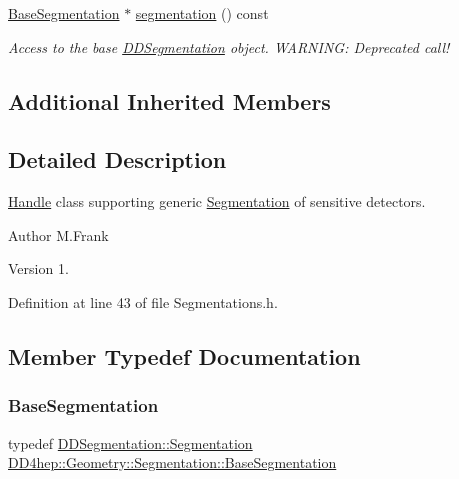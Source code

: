 \begin{DoxyCompactItemize}
\hyperlink{class_d_d4hep_1_1_geometry_1_1_segmentation_a50fcd62c91daf63c26a333d1ee51b192}{Base\+Segmentation} $\ast$ \hyperlink{class_d_d4hep_1_1_geometry_1_1_segmentation_a72ebea05efd4acd46adb3ed985c3f1d9}{segmentation} () const
\begin{DoxyCompactList}\small\item\em Access to the base \hyperlink{namespace_d_d4hep_1_1_d_d_segmentation}{D\+D\+Segmentation} object. W\+A\+R\+N\+I\+NG\+: Deprecated call! \end{DoxyCompactList}\end{DoxyCompactItemize}
\subsection*{Additional Inherited Members}


\subsection{Detailed Description}
\hyperlink{class_d_d4hep_1_1_handle}{Handle} class supporting generic \hyperlink{class_d_d4hep_1_1_geometry_1_1_segmentation}{Segmentation} of sensitive detectors. 

\begin{DoxyAuthor}{Author}
M.\+Frank 
\end{DoxyAuthor}
\begin{DoxyVersion}{Version}
1. 
\end{DoxyVersion}


Definition at line 43 of file Segmentations.\+h.



\subsection{Member Typedef Documentation}
\hypertarget{class_d_d4hep_1_1_geometry_1_1_segmentation_a50fcd62c91daf63c26a333d1ee51b192}{}\label{class_d_d4hep_1_1_geometry_1_1_segmentation_a50fcd62c91daf63c26a333d1ee51b192} 
\subsubsection{\texorpdfstring{Base\+Segmentation}{BaseSegmentation}}
{\footnotesize\ttfamily typedef \hyperlink{class_d_d4hep_1_1_d_d_segmentation_1_1_segmentation}{D\+D\+Segmentation\+::\+Segmentation} \hyperlink{class_d_d4hep_1_1_geometry_1_1_segmentation_a50fcd62c91daf63c26a333d1ee51b192}{D\+D4hep\+::\+Geometry\+::\+Segmentation\+::\+Base\+Segmentation}}



